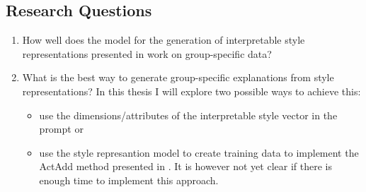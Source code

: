 \subsection{Research Questions}
\begin{enumerate}
  \item How well does the model for the generation of interpretable style representations presented in \citet{patelLearningInterpretableStyle2023} work on group-specific data?
  \item What is the best way to generate group-specific explanations from style representations? \newline
  In this thesis I will explore two possible ways to achieve this:
  \begin{itemize}
    \item use the dimensions/attributes of the interpretable style vector in the prompt or
    \item use the style represantion model to create training data to implement the ActAdd method presented in \citet{turnerActivationAdditionSteering2024}. It is however not yet clear if there is enough time to implement this approach.
  \end{itemize}
\end{enumerate}

